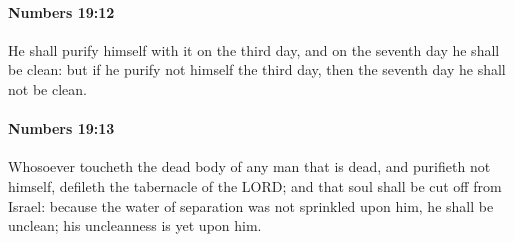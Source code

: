 		\paragraph{Numbers 19:12} %
			\label{NUMBERS-19-12}

			He shall purify himself with it on the third day, and on the seventh day he shall be clean: but if he purify not himself the third day, then the seventh day he shall not be clean.


		\paragraph{Numbers 19:13} %
			\label{NUMBERS-19-13}

			Whosoever toucheth the dead body of any man that is dead, and purifieth not himself, defileth the tabernacle of the LORD; and that soul shall be cut off from Israel: because the water of separation was not sprinkled upon him, he shall be unclean; his uncleanness is yet upon him.

